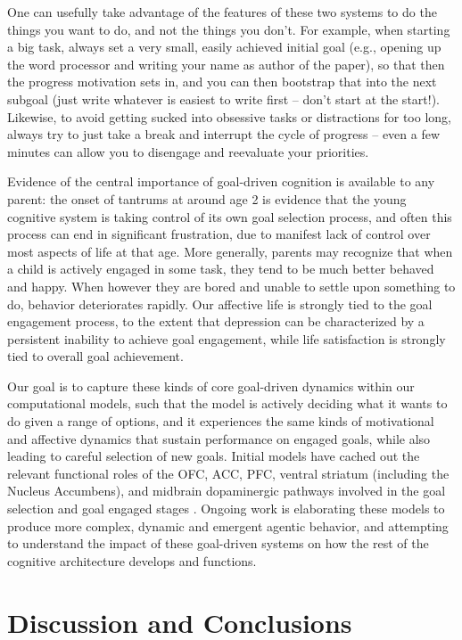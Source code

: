 \documentclass[11pt,twoside]{article}
\newif\myifpdf
\begin{document}
One can usefully take advantage of the features of these two systems to do the things you want to do, and not the things you don't.  For example, when starting a big task, always set a very small, easily achieved initial goal (e.g., opening up the word processor and writing your name as author of the paper), so that then the progress motivation sets in, and you can then bootstrap that into the next subgoal (just write whatever is easiest to write first -- don't start at the start!).  Likewise, to avoid getting sucked into obsessive tasks or distractions for too long, always try to just take a break and interrupt the cycle of progress -- even a few minutes can allow you to disengage and reevaluate your priorities.

Evidence of the central importance of goal-driven cognition is available to any parent: the onset of tantrums at around age 2 is evidence that the young cognitive system is taking control of its own goal selection process, and often this process can end in significant frustration, due to manifest lack of control over most aspects of life at that age.  More generally, parents may recognize that when a child is actively engaged in some task, they tend to be much better behaved and happy.  When however they are bored and unable to settle upon something to do, behavior deteriorates rapidly.  Our affective life is strongly tied to the goal engagement process, to the extent that depression can be characterized by a persistent inability to achieve goal engagement, while life satisfaction is strongly tied to overall goal achievement.

Our goal is to capture these kinds of core goal-driven dynamics within our computational models, such that the model is actively deciding what it wants to do given a range of options, and it experiences the same kinds of motivational and affective dynamics that sustain performance on engaged goals, while also leading to careful selection of new goals.  Initial models have cached out the relevant functional roles of the OFC, ACC, PFC, ventral striatum (including the Nucleus Accumbens), and midbrain dopaminergic pathways involved in the goal selection and goal engaged stages \cite{OReillyHazyMollickEtAl14}.  Ongoing work is elaborating these models to produce more complex, dynamic and emergent agentic behavior, and attempting to understand the impact of these goal-driven systems on how the rest of the cognitive architecture develops and functions.

\section{Discussion and Conclusions}
\end{document}
